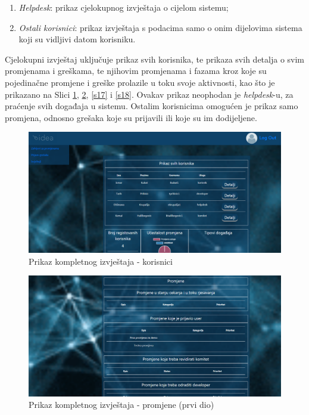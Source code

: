 \documentclass[12pt,a4paper]{article}
\begin{document}
\begin{enumerate}
\item \textit{Helpdesk}: prikaz cjelokupnog izvještaja o cijelom sistemu;
\item \textit{Ostali korisnici}: prikaz izvještaja s podacima samo o onim dijelovima sistema koji su vidljivi datom korisniku.
\end{enumerate}

Cjelokupni izvještaj uključuje prikaz svih korisnika, te prikaza svih detalja o svim promjenama i greškama, te njihovim promjenama i fazama kroz koje su pojedinačne promjene i greške prolazile u toku svoje aktivnosti, kao što je prikazano na Slici \ref{s15}, \ref{s16}, \ref{s17} i \ref{s18}. Ovakav prikaz neophodan je \textit{helpdesk}-u, za praćenje svih događaja u sistemu. Ostalim korisnicima omogućen je prikaz samo promjena, odnosno grešaka koje su prijavili ili koje su im dodijeljene.

\begin{figure}[H]
\center
\includegraphics[scale=0.35]{../res/UI/report1.PNG}
\caption{Prikaz kompletnog izvještaja - korisnici}
\label{s15}
\end{figure}

\begin{figure}[H]
\center
\includegraphics[scale=0.35]{../res/UI/report2.PNG}
\caption{Prikaz kompletnog izvještaja - promjene (prvi dio)}
\label{s16}
\end{figure}
\end{document}
